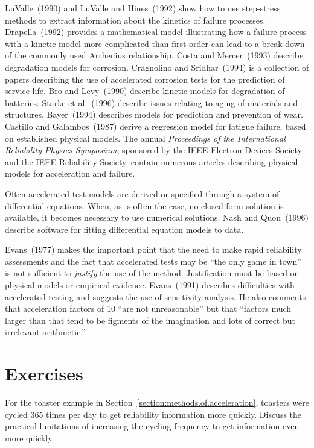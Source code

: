 LuValle~(1990) and LuValle and Hines~(1992) show how to use
step-stress methods to extract information about the kinetics of
failure processes.  Drapella~(1992) provides a mathematical model
illustrating how a failure process with a kinetic model more
complicated than first order can lead to a break-down of the
commonly used Arrhenius relationship. Costa and Mercer~(1993)
describe degradation models for corrosion.  Cragnolino and
Sridhar~(1994) is a collection of papers describing the use of
accelerated corrosion tests for the prediction of service life. Bro
and Levy~(1990) describe kinetic models for degradation of
batteries.  Starke et al.~(1996) describe issues relating to aging
of materials and structures. Bayer~(1994) describes models for
prediction and prevention of wear.  Castillo and Galambos~(1987)
derive a regression model for fatigue failure, based on established
physical models.  The annual {\em Proceedings of the International
Reliability Physics Symposium}, sponsored by the IEEE Electron
Devices Society and the IEEE Reliability Society, contain numerous
articles describing physical models for acceleration and failure.

Often accelerated test models are derived or specified
through a system of differential equations.  When, as is often the
case, no closed form solution is available, it becomes necessary to
use numerical solutions. Nash and Quon~(1996) describe software for
fitting differential equation models to data.  

Evans~(1977) makes the important point that the need to make rapid
reliability assessments and the fact that accelerated tests may be
``the only game in town'' is not sufficient to {\em justify} the use
of the method.  Justification must be based on physical models or
empirical evidence. Evans~(1991) describes difficulties with
accelerated testing and suggests the use of sensitivity analysis. He
also comments that acceleration factors of 10 ``are not
unreasonable'' but that ``factors much larger than that tend to be
figments of the imagination and lots of correct but irrelevant
arithmetic.''
\section*{Exercises}
\begin{exercise}
For the toaster example in
Section~\ref{section:methods.of.acceleration}, toasters were cycled
365 times per day to get reliability information more quickly. Discuss
the practical limitations of increasing the cycling frequency to get
information even more quickly.
\end{exercise}

